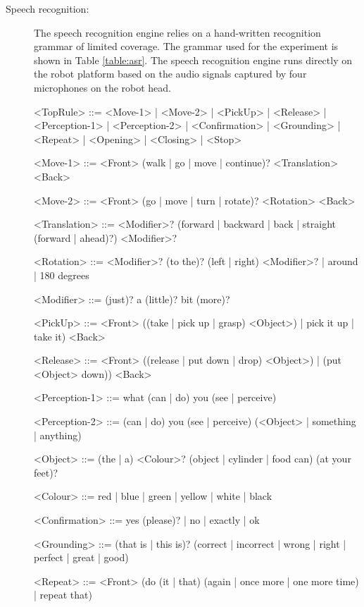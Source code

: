 \begin{description}
\item[Speech recognition: ] The speech recognition engine relies on a hand-written recognition grammar of limited coverage. The grammar used for the experiment is shown in Table \ref{table:asr}.  The speech recognition engine runs directly on the robot platform based on the audio signals captured by four microphones on the robot head.

\setlength{\grammarindent}{9em} 

\begin{table}[p!]
\vspace{2cm}
\begin{grammar}

<TopRule> ::= <Move-1> | <Move-2> | <PickUp> | <Release> | <Perception-1> | <Perception-2> | <Confirmation> | <Grounding> | <Repeat> | <Opening> | <Closing> | <Stop> 

<Move-1> ::= <Front> (walk | go | move | continue)? <Translation> <Back>

<Move-2> ::= <Front> (go | move | turn | rotate)? <Rotation> <Back>

<Translation> ::= <Modifier>? (forward | backward | back | straight (forward | ahead)?) <Modifier>?

<Rotation> ::= <Modifier>? (to the)? (left | right) <Modifier>? | around | 180 degrees

<Modifier> ::= (just)? a (little)? bit (more)? 

<PickUp> ::= <Front> ((take | pick up | grasp) <Object>) | pick it up | take it) <Back>

<Release> ::= <Front> ((release | put down | drop) <Object>) | (put <Object> down)) <Back> 

<Perception-1> ::= what (can | do) you (see | perceive)

<Perception-2> ::= (can | do) you (see | perceive) (<Object> | something | anything)

<Object> ::= (the | a) <Colour>? (object | cylinder | food can) (at your feet)? 

<Colour> ::= red | blue | green | yellow | white | black 

<Confirmation> ::= yes (please)? | no | exactly | ok 

<Grounding> ::= (that is | this is)? (correct  | incorrect | wrong | right | perfect | great | good) 

<Repeat> ::= <Front> (do (it | that) (again | once more | one more time) | repeat that)


\end{grammar}
\end{table}
\end{description}
